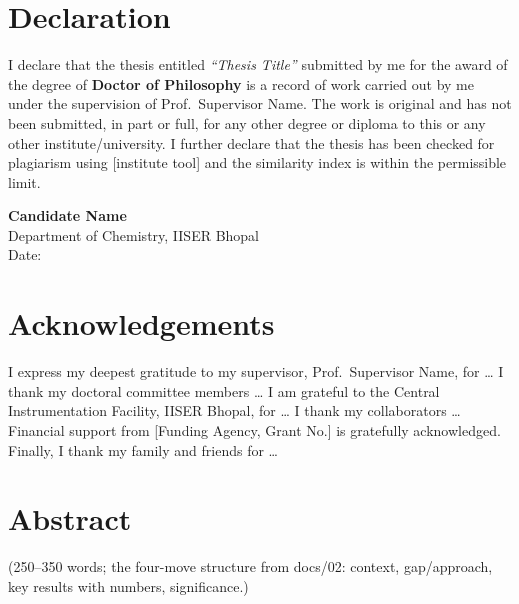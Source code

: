 \chapter*{Declaration}
\thispagestyle{empty}
I declare that the thesis entitled \emph{``Thesis Title''} submitted by me for
the award of the degree of \textbf{Doctor of Philosophy} is a record of work
carried out by me under the supervision of Prof.~Supervisor Name. The work is
original and has not been submitted, in part or full, for any other degree or
diploma to this or any other institute/university. I further declare that the
thesis has been checked for plagiarism using [institute tool] and the similarity
index is within the permissible limit.

\vspace{2cm}
\begin{flushright}
\textbf{Candidate Name}\\
Department of Chemistry, IISER Bhopal\\[0.5cm]
Date:
\end{flushright}

\chapter*{Acknowledgements}
\thispagestyle{empty}
I express my deepest gratitude to my supervisor, Prof.~Supervisor Name, for
\ldots{} I thank my doctoral committee members \ldots{} I am grateful to the
Central Instrumentation Facility, IISER Bhopal, for \ldots{} I thank my
collaborators \ldots{} Financial support from [Funding Agency, Grant No.] is
gratefully acknowledged. Finally, I thank my family and friends for \ldots{}

\chapter*{Abstract}
\thispagestyle{empty}
(250--350 words; the four-move structure from docs/02: context, gap/approach,
key results with numbers, significance.)
